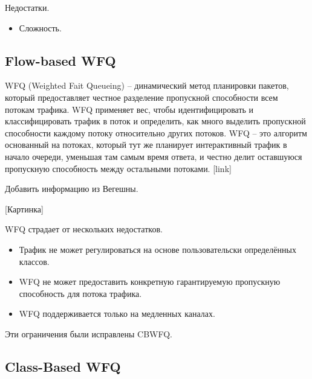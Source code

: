         Недостатки.
		\begin{itemize}
            \item Сложность.
		\end{itemize}

	\subsection{Flow-based WFQ}

	WFQ (Weighted Fait Queueing) -- динамический метод планировки пакетов, который
	предоставляет честное разделение пропускной способности всем потокам трафика.
	WFQ применяет вес, чтобы идентифицировать и классифицировать трафик
	в поток и определить, как много выделить пропускной способности каждому
	потоку относительно других потоков. WFQ -- это алгоритм основанный на потоках,
	который тут же планирует интерактивный трафик в начало очереди,
	уменьшая там самым время ответа, и честно делит оставшуюся пропускную
	способность между остальными потоками. 
	[link]

	Добавить информацию из Вегешны.

	[Картинка]
	

    WFQ страдает от нескольких недостатков.
	\begin{itemize}
    	\item  Трафик не может регулироваться на основе пользовательски определённых классов.
    	\item  WFQ не может предоставить конкретную гарантируемую пропускную способность для потока трафика.
    	\item  WFQ поддерживается только на медленных каналах.
	\end{itemize}

    Эти ограничения были исправлены CBWFQ.

	\subsection{Class-Based WFQ}


